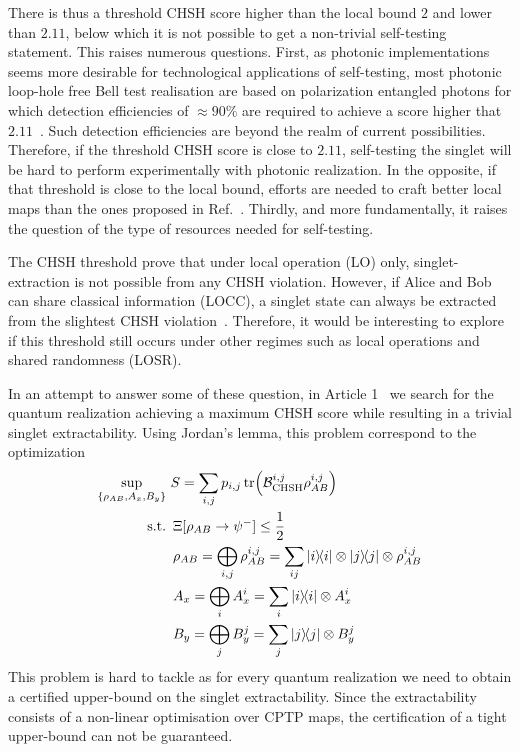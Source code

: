 \medbreak

There is thus a threshold CHSH score higher than the local bound $2$ and lower than $2.11$, below which it is not possible to get a non-trivial self-testing statement.
This raises numerous questions. 
First, as photonic implementations seems more desirable for technological applications of self-testing, most photonic loop-hole free Bell test realisation are based on polarization entangled photons for which detection efficiencies of $\approx 90\%$ are required to achieve a score higher that $2.11$~\cite{Vivoli2015b}. 
Such detection efficiencies are beyond the realm of current possibilities. 
Therefore, if the threshold CHSH score is close to $2.11$, self-testing the singlet will be hard to perform experimentally with photonic realization.
In the opposite, if that threshold is close to the local bound, efforts are needed to craft better local maps than the ones proposed in Ref.~\cite{Kaniewski2016}.
Thirdly, and more fundamentally, it raises the question of the type of resources needed for self-testing.

The CHSH threshold prove that under local operation (LO) only, singlet-extraction is not possible from any CHSH violation.
However, if Alice and Bob can share classical information (LOCC), a singlet state can always be extracted from the slightest CHSH violation~\cite{Bardyn2009}. 
Therefore, it would be interesting to explore if this threshold still occurs under other regimes such as local operations and shared randomness (LOSR).

\medbreak

In an attempt to answer some of these question, in Article 1~\cite{Valcarce2020} we search for the quantum realization achieving a maximum CHSH score while resulting in a trivial singlet extractability.
Using Jordan's lemma, this problem correspond to the optimization
\begin{equation}
	\begin{split}
		\sup_{\{\rho_{AB},A_x,B_y\}}\ &S=\sum_{i,j} p_{i,j} \tr (\mathcal{B}_\text{CHSH}^{i,j} \rho_{AB}^{i,j})\\
\textnormal{s.t.}\ &\,\Xi[\rho_{AB}\rightarrow \psi^-] \leq \frac{1}{2} \\
				   &\, \rho_{AB} = \bigoplus_{i,j} \rho_{AB}^{i,j} = \sum_{ij} \ketbra{i} \otimes \ketbra{j} \otimes \rho_{AB}^{i,j} \\
				   &\, A_x = \bigoplus_{i} A_x^i = \sum_{i} \ketbra{i} \otimes A_x^{i} \\
				   &\, B_y = \bigoplus_{j} B_y^j = \sum_{j} \ketbra{j} \otimes B_y^{j}
	\end{split}
	\label{eq:CHSH_threshold}
\end{equation}
This problem is hard to tackle as for every quantum realization we need to obtain a certified upper-bound on the singlet extractability.
Since the extractability consists of a non-linear optimisation over CPTP maps, the certification of a tight upper-bound can not be guaranteed.

